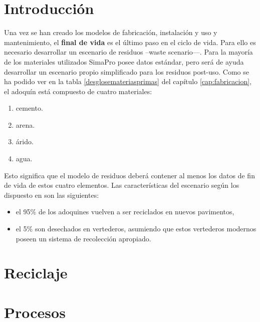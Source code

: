 \section{Introducción}
Una vez se han creado los modelos de fabricación, instalación y uso y mantenimiento, el \textbf{final de vida} es el último paso en el ciclo de vida. Para ello es necesario desarrollar un escenario de residuos –waste scenario—. Para la mayoría de los materiales utilizados SimaPro posee datos estándar, pero será de ayuda desarrollar un escenario propio simplificado para los residuos post-uso. Como se ha podido ver en la tabla \ref{desglosemateriasprimas} del capítulo \ref{cap:fabricacion}, el adoquín está compuesto de cuatro materiales:

\begin{enumerate}
  \item cemento.
  \item arena.
  \item árido.
  \item agua.
\end{enumerate}

Esto significa que el modelo de residuos deberá contener al menos los datos de fin de vida de estos cuatro elementos. Las características del escenario según los dispuesto en \cite{euroadoquin} son las siguientes:
\begin{itemize}
  \item el 95\% de los adoquines vuelven a ser reciclados en nuevos pavimentos,
  \item el 5\% son desechados en vertederos, asumiendo que estos vertederos modernos poseen un sistema de recolección apropiado.
\end{itemize}


\section{Reciclaje}
\section{Procesos}



